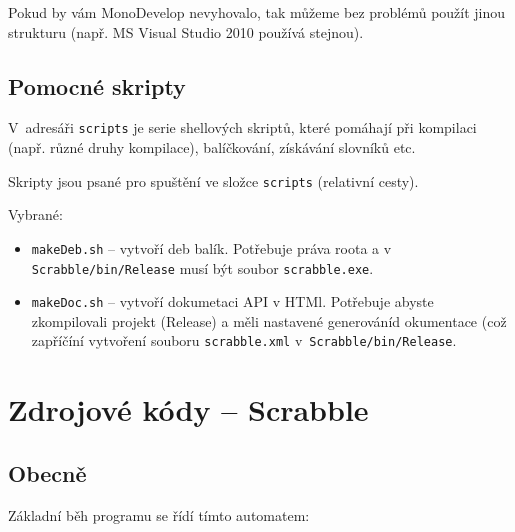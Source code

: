 \documentclass[a4paper]{article}
\begin{document}
Pokud by vám MonoDevelop nevyhovalo, tak můžeme bez problémů použít jinou strukturu (např. MS Visual Studio 2010 používá stejnou).

\subsection{Pomocné skripty}\label{scripts}
V~adresáři \texttt{scripts} je serie shellových skriptů, které pomáhají při kompilaci (např. různé druhy kompilace), balíčkování, získávání slovníků etc. 

Skripty jsou psané pro spuštění ve složce \texttt{scripts} (relativní cesty).

Vybrané:

\begin{itemize}
\item \texttt{makeDeb.sh} -- vytvoří deb balík. Potřebuje práva roota a v \texttt{Scrabble/bin/Release} musí být soubor \texttt{scrabble.exe}.
\item \texttt{makeDoc.sh} -- vytvoří dokumetaci API v HTMl. Potřebuje abyste zkompilovali projekt (Release) a měli nastavené generováníd okumentace (což zapříčíní vytvoření souboru \texttt{scrabble.xml} v~\texttt{Scrabble/bin/Release}.
\end{itemize}


\section{Zdrojové kódy -- Scrabble}\label{scrabble}
\subsection{Obecně}
Základní běh programu se řídí tímto automatem:

\end{document}
